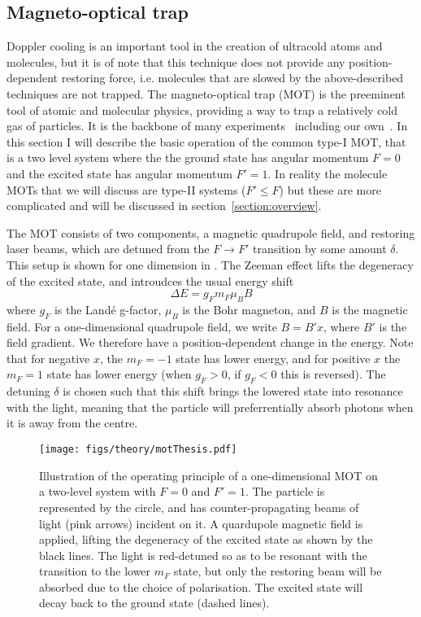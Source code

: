 \subsection{Magneto-optical trap}

Doppler cooling is an important tool in the creation of ultracold atoms and
molecules, but it is of note that this technique does not provide any
position-dependent restoring force, i.e. molecules that are slowed by the
above-described techniques are not trapped.
%
The magneto-optical trap (MOT) is the preeminent tool of atomic and molecular
physics, providing a way to trap a relatively cold gas of particles. It is the
backbone of many experiments~\cite{} including our own~\cite{}. In this section
I will describe the basic operation of the common type-I MOT, that is a two
level system where the the ground state has angular momentum $F=0$ and the
excited state has angular momentum $F'=1$.  In reality the molecule MOTs that
we will discuss are type-II systems ($F'\leq F$) but these are more complicated
and will be discussed in section~\ref{section:overview}.

The MOT consists of two components, a magnetic quadrupole field, and restoring
laser beams, which are detuned from the $F\rightarrow F'$ transition by some
amount $\delta$. This setup is shown for one dimension in . The Zeeman effect lifts the degeneracy of the excited state, and
introudces the usual energy shift~\cite{Binney}
%
\begin{equation}
  \Delta E = g_F m_F \mu_B B
  \label{theory:eqn:zeeman}
\end{equation}
%
where $g_F$ is the Land\'e g-factor, $\mu_B$ is the Bohr magneton, and $B$ is
the magnetic field. For a one-dimensional quadrupole field, we write $B=B'x$,
where $B'$ is the field gradient. We therefore have a position-dependent change
in the energy. Note that for negative $x$, the $m_F=-1$ state has lower energy,
and for positive $x$ the $m_F=1$ state has lower energy (when $g_F>0$, if
$g_F<0$ this is reversed).
%
The detuning $\delta$ is chosen such that this shift brings the lowered state
into resonance with the light, meaning that the particle will preferrentially
absorb photons when it is away from the centre.

\begin{figure}[ht]
  \centering
  \texttt{[image: figs/theory/motThesis.pdf]}
  \caption{Illustration of the operating principle of a one-dimensional MOT on
    a two-level system with $F=0$ and $F'=1$. The particle is represented by
    the circle, and has counter-propagating beams of light (pink arrows)
    incident on it. A quardupole magnetic field is applied, lifting the
    degeneracy of the excited state as shown by the black lines. The light is
    red-detuned so as to be resonant with the transition to the lower $m_F$
    state, but only the restoring beam will be absorbed due to the choice of
    polarisation. The excited state will decay back to the ground state (dashed
    lines).
  }
  \label{theory:fig:MOT}
\end{figure}


